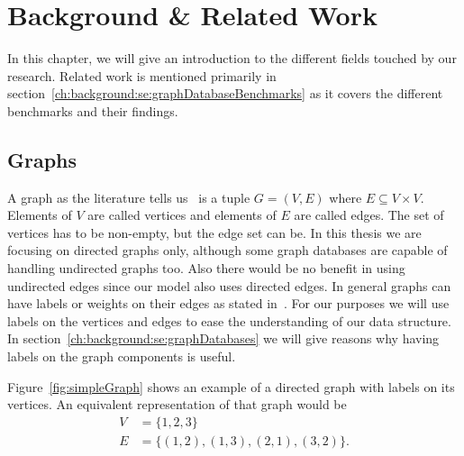\chapter{Background \& Related Work}
\label{ch:background}
In this chapter,
we will give an introduction to the different fields touched by our research.
Related work is mentioned primarily in section~\ref{ch:background:se:graphDatabaseBenchmarks} as it covers the different benchmarks and their findings.

\section{Graphs}
\label{ch:background:se:graphs}
A graph as the literature tells us~\cite[89]{Worsch2011} is a tuple $ G = (V, E) $ where $ E \subseteq V \times V $.
Elements of $ V $ are called vertices and elements of $ E $ are called edges.
The set of vertices has to be non-empty,
but the edge set can be.
In this thesis we are focusing on directed graphs only,
although some graph databases are capable of handling undirected graphs too.
Also there would be no benefit in using undirected edges since our model also uses directed edges.
In general graphs can have labels or weights on their edges as stated in~\cite[99]{Worsch2011}.
For our purposes we will use labels on the vertices and edges to ease the understanding of our data structure.
In section~\ref{ch:background:se:graphDatabases} we will give reasons why having labels on the graph components is useful.

Figure~\ref{fig:simpleGraph} shows an example of a directed graph with labels on its vertices.
An equivalent representation of that graph would be
\begin{equation}
  \begin{aligned}
    V &= \{1, 2, 3\} \\
    E &= \{(1, 2), (1, 3), (2, 1), (3, 2)\}.
  \end{aligned}
\end{equation}

